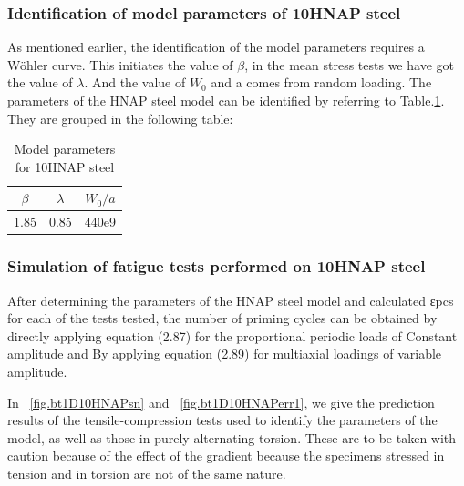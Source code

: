 \documentclass[3p,times,number,review]{elsarticle}
\newcommand{\figref}[1]{\figurename~\ref{#1}}
\begin{document}
\subsubsection{Identification of model parameters of 10HNAP steel}
As mentioned earlier, the identification of the model parameters requires a Wöhler curve. This initiates the value of $\beta$, in the mean stress tests we have got the value of $\lambda$. And the value of $W_0$ and a comes from random loading. The parameters of the HNAP steel model can be identified by referring to Table.\ref{tab.10HNAP.para}. They are grouped in the following table:
\begin{table}[!h]
	\centering
	\begin{tabular}{|c|c|c|}
		\hline
		\textbf{$\beta$} & \textbf{$\lambda$}  & \textbf{$W_0/a$}  \\ \hline
		1.85        & 0.85           & 440e9       \\ \hline
	\end{tabular}
	\caption{Model parameters for 10HNAP steel}
	\label{tab.10HNAP.para}
\end{table}

\subsubsection{Simulation of fatigue tests performed on 10HNAP steel}
After determining the parameters of the HNAP steel model and calculated εpcs for each of the tests tested, the number of priming cycles can be obtained by directly applying equation (2.87) for the proportional periodic loads of Constant amplitude and
By applying equation (2.89) for multiaxial loadings of variable amplitude.

In \figref{fig.bt1D10HNAPsn} and \figref{fig.bt1D10HNAPerr1}, we give the prediction results of the tensile-compression tests used to identify the parameters of the model, as well as those in purely alternating torsion. These are to be taken with caution because of the effect of the gradient because the specimens stressed in tension and in torsion are not of the same nature.
\end{document}
